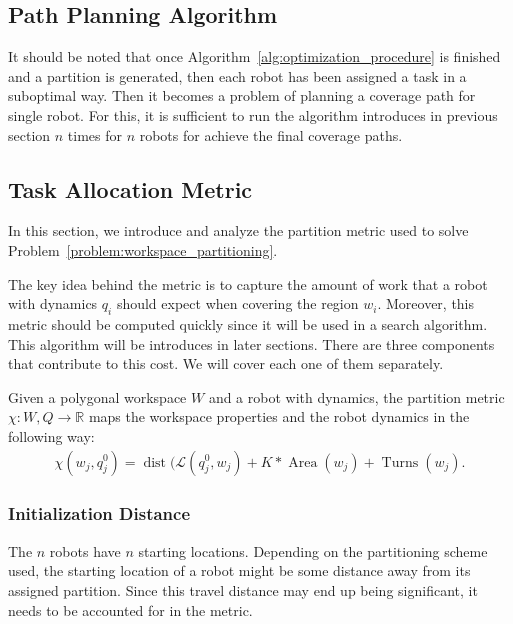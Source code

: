 \documentclass[../main.tex]{subfiles}
\begin{document}
\subsection{Path Planning Algorithm}
It should be noted that once Algorithm~\ref{alg:optimization_procedure} is finished and a partition is generated, then each robot has been assigned a task in a suboptimal way. Then it becomes a problem of planning a coverage path for single robot. For this, it is sufficient to run the algorithm introduces in previous section $n$ times for $n$ robots for achieve the final coverage paths.


\subsection{Task Allocation Metric}
\label{sec:task_allocation_metric}

In this section, we introduce and analyze the partition metric used to solve Problem~\ref{problem:workspace_partitioning}.

The key idea behind the metric is to capture the amount of work that a robot with dynamics $q_i$ should expect when covering the region $w_i$. Moreover, this metric should be computed quickly since it will be used in a search algorithm. This algorithm will be introduces in later sections. There are three components that contribute to this cost. We will cover each one of them separately.

\begin{definition}
Given a polygonal workspace $W$ and a robot with dynamics, the partition metric $\chi:W,Q\to\mathbb{R}$ maps the workspace properties and the robot dynamics in the following way:
	\begin{equation}
		\begin{aligned}
			\chi(w_j,q_j^0)=\operatorname{dist}(\mathcal{L}(q^0_j,w_j)+K*\operatorname{Area}(w_j)+\operatorname{Turns}(w_j).
		\end{aligned}
	\end{equation}
\end{definition}


\subsubsection{Initialization Distance}

The $n$ robots have $n$ starting locations. Depending on the partitioning scheme used, the starting location of a robot might be some distance away from its assigned partition. Since this travel distance may end up being significant, it needs to be accounted for in the metric.
\end{document}
